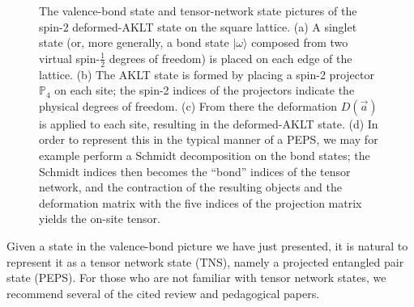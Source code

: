 \documentclass[aps,prb,letterpaper,superscriptaddress,twocolumn,showpacs,floatfix,10pt]{revtex4-1}
\begin{document}
\begin{figure}[h]
\begin{subfigure}
  \end{subfigure}
  \begin{subfigure}
    \centering
  \end{subfigure}
  \caption{The valence-bond state and tensor-network state pictures of the
  spin-2 deformed-AKLT state on the square lattice.
  (a) A singlet state (or, more generally, a bond state $|\omega\rangle$
  composed from two virtual spin-$\frac{1}{2}$ degrees of freedom) is placed
  on each edge of the lattice.
  (b) The AKLT state is formed by placing a spin-2 projector $\mathbb{P}_4$ on
  each site; the spin-2 indices of the projectors indicate the physical
  degrees of freedom.
  (c) From there the deformation $D(\vec{a})$ is applied to each site, resulting
  in the deformed-AKLT state.
  (d) In order to represent this in the typical manner of a PEPS, we may for
  example perform a Schmidt decomposition on the bond states; the Schmidt
  indices then becomes the ``bond'' indices of the tensor network, and the
  contraction of the resulting objects and the deformation matrix with the
  five indices of the projection matrix yields the on-site tensor.}
  \label{fig:aklt_structure_square}
\end{figure}
Given a state in the valence-bond picture we have just presented, it is natural
to represent it as a tensor network state (TNS), namely a projected entangled
pair state (PEPS). For those who are not familiar with tensor
network states, we recommend several of the cited review and pedagogical
papers\cite{Vidal_iPEPS_2009,PerezGarciaMPS,PerezGarciaPEPS,BridgemanChubb,
MPS_PEPS_phases}.
\end{document}
